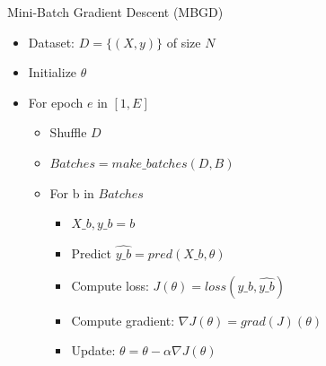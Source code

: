 \documentclass[usenames,dvipsnames]{beamer}
\begin{document}
                    \begin{frame}{Mini-Batch Gradient Descent (MBGD)}
                        \begin{itemize}
                            \item Dataset: $D = \{(X, y)\}$ of size $N$
                            \item Initialize $\theta$
                            \item For epoch $e$ in $[1, E]$
                            \begin{itemize}
                                \item Shuffle $D$
                                \item $Batches = make\_batches(D, B)$
                                \item For b in $Batches$
                                \begin{itemize}
                                    \item $X\_b, y\_b = b$
                                    \item Predict $\hat{y\_b} = pred(X\_b, \theta)$
                                    \item Compute loss: $J(\theta) = loss(y\_b, \hat{y\_b})$
                                    \item Compute gradient: $\nabla J(\theta) = grad(J)(\theta)$
                                    \item Update: $\theta = \theta - \alpha \nabla J(\theta)$
                                \end{itemize}
                            \end{itemize}
                        \end{itemize}
                    \end{frame}
                        
                        
                    
                        
                    
\end{document}
